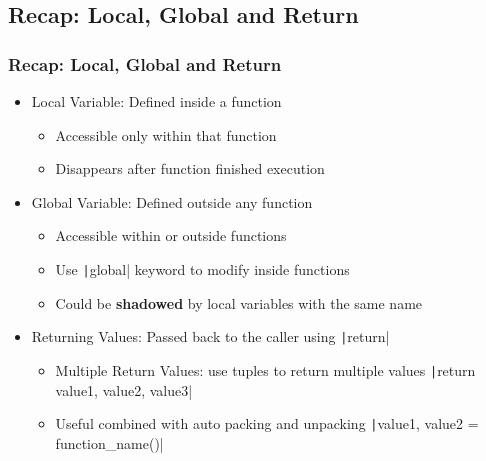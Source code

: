 \documentclass{beamer}
\newcommand{\python}[1]{\texttt|#1|}
\begin{document}
\subsection{Recap: Local, Global and Return}
\begin{frame}
    \frametitle{Recap: Local, Global and Return}
    \begin{itemize}
        \item Local Variable: Defined inside a function
              \begin{itemize}
                  \item Accessible only within that function
                  \item Disappears after function finished execution
              \end{itemize}
        \item Global Variable: Defined outside any function
              \begin{itemize}
                  \item Accessible within or outside functions
                  \item Use \python{global} keyword to modify inside functions
                  \item Could be \textbf{shadowed} by local variables with the same name
              \end{itemize}
        \item Returning Values: Passed back to the caller using \python{return}
              \begin{itemize}
                  \item Multiple Return Values: use tuples to return multiple values
                        \python{return value1, value2, value3}
                  \item Useful combined with auto packing and unpacking
                        \python{value1, value2 = function_name()}
              \end{itemize}
    \end{itemize}
\end{frame}
\end{document}
